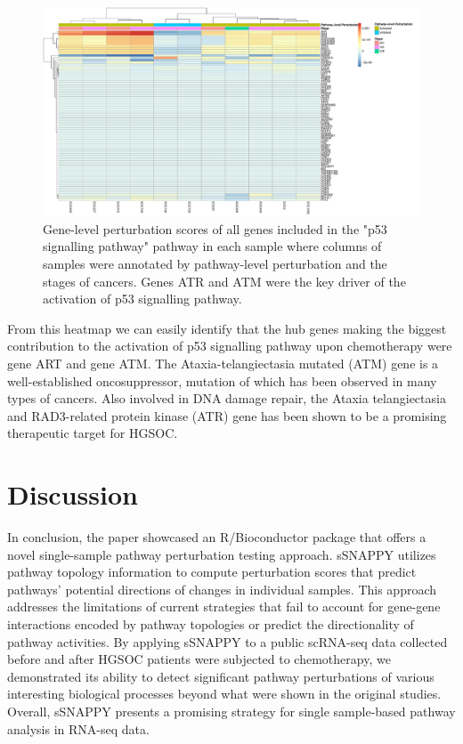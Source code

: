 \documentclass[9pt,a4paper,]{extarticle}
\begin{document}
\begin{figure}

{\centering \includegraphics[width=1\linewidth]{sSNAPPY_paper_files/figure-latex/Figure4-1} 

}

\caption{Gene-level perturbation scores of all genes included in the "p53 signalling pathway" pathway in each sample where columns of samples were annotated by pathway-level perturbation and the stages of cancers. Genes ATR and ATM were the key driver of the activation of p53 signalling pathway. }\label{fig:Figure4}
\end{figure}

From this heatmap we can easily identify that the hub genes making the biggest contribution to the activation of p53 signalling pathway upon chemotherapy were gene ART and gene ATM. The Ataxia-telangiectasia mutated (ATM) gene is a well-established oncosuppressor\citep{Moslemi2021}, mutation of which has been observed in many types of cancers\citep{Choi2016}. Also involved in DNA damage repair, the Ataxia telangiectasia and RAD3-related protein kinase (ATR) gene has been shown to be a promising therapeutic target for HGSOC\citep{Li2022}.

\hypertarget{discussion}{%
\section{Discussion}\label{discussion}}

In conclusion, the paper showcased an R/Bioconductor package that offers a novel single-sample pathway perturbation testing approach. sSNAPPY utilizes pathway topology information to compute perturbation scores that predict pathways' potential directions of changes in individual samples. This approach addresses the limitations of current strategies that fail to account for gene-gene interactions encoded by pathway topologies or predict the directionality of pathway activities. By applying sSNAPPY to a public scRNA-seq data collected before and after HGSOC patients were subjected to chemotherapy, we demonstrated its ability to detect significant pathway perturbations of various interesting biological processes beyond what were shown in the original studies. Overall, sSNAPPY presents a promising strategy for single sample-based pathway analysis in RNA-seq data.
\end{document}
